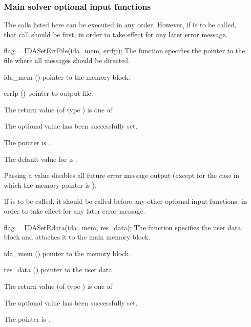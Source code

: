\subsubsection{Main solver optional input functions}
The calls listed here can be executed in any order. However, if  
is to be called, that call should be first, in order to take effect for any later 
error message.

{
flag = IDASetErrFile(ida\_mem, errfp);
}
{
  The function  specifies the pointer to the file
  where all {\ida} messages should be directed.
}
{
  \begin{args}
  \item[ida\_mem] ()
    pointer to the {\ida} memory block.
  \item[errfp] ()
    pointer to output file.
  \end{args}
}
{
  The return value  (of type ) is one of
  \begin{args}
  \item[\Id{IDA\_SUCCESS}] 
    The optional value has been successfully set.
  \item[\Id{IDA\_MEM\_NULL}]
    The  pointer is .
  \end{args}
}
{
  The default value for  is .

  Passing a value  disables all future error message output
  (except for the case in which the {\ida} memory pointer is ).

  {\warn} If  is to be called, it should be called before any
  other optional input functions, in order to take effect for any later error message.
}
{
  flag = IDASetRdata(ida\_mem, res\_data);
}
{
  The function  specifies the user data block 
  and attaches it to the main {\ida} memory block.
}
{
  \begin{args}
  \item[ida\_mem] ()
    pointer to the {\ida} memory block.
  \item[res\_data] ()
    pointer to the user data.
  \end{args}
}
{
  The return value  (of type ) is one of
  \begin{args}
  \item[\Id{IDA\_SUCCESS}] 
    The optional value has been successfully set.
  \item[\Id{IDA\_MEM\_NULL}]
    The  pointer is .
  \end{args}
}
